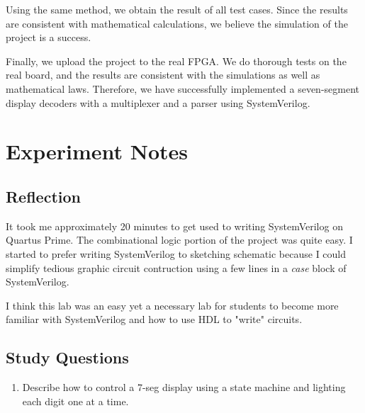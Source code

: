 \documentclass[12pt]{article}
\begin{document}
Using the same method, we obtain the result of all test cases. Since the results are consistent with mathematical calculations, we believe the simulation of the project is a success.

Finally, we upload the project to the real FPGA. We do thorough tests on the real board, and the results are consistent with the simulations as well as mathematical laws. Therefore, we have successfully implemented a seven-segment display decoders with a multiplexer and a parser using SystemVerilog.

\section{Experiment Notes}

\subsection*{Reflection}

It took me approximately 20 minutes to get used to writing SystemVerilog on Quartus Prime. The combinational logic portion of the project was quite easy. I started to prefer writing SystemVerilog to sketching schematic because I could simplify tedious graphic circuit contruction using a few lines in a \textit{case} block of SystemVerilog.

I think this lab was an easy yet a necessary lab for students to become more familiar with SystemVerilog and how to use HDL to "write" circuits.

\subsection*{Study Questions}

\begin{enumerate}
  \item Describe how to control a 7-seg display using a state machine and lighting each digit one at a time.
\end{enumerate}

\end{document}
